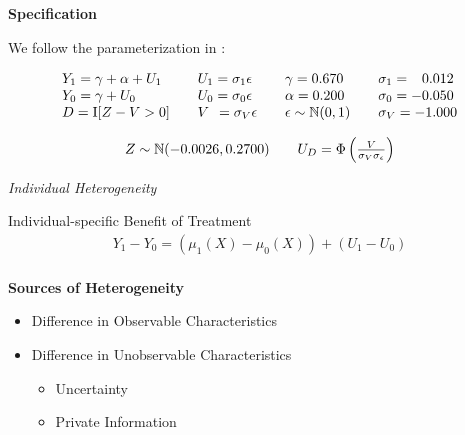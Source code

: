 \begin{frame}\textbf{Specification}\vspace{0.3cm}

We follow the parameterization in \citet{Heckman.2005e}:

\begin{align*}\begin{array}{l@{\qquad}l@{\qquad}l@{\qquad}l}
Y_1 = \gamma + \alpha + U_1 & U_1 = \sigma_1 \epsilon & \gamma = 0.670          & \sigma_1 = \phantom{-}0.012 \\
Y_0 = \gamma + U_0          & U_0 = \sigma_0 \epsilon & \alpha = 0.200          & \sigma_0 = -0.050 \\
D = \mathrm{I}[Z - V > 0]   & V\phantom{_0} = \sigma_V \epsilon   & \epsilon \sim \N(0, 1) & \sigma_V = -1.000 \\
\end{array}\end{align*}

\begin{align*}\begin{array}{l@{\qquad}l}
Z \sim \N(-0.0026, 0.2700)  & U_D = \Phi\left(\frac{V}{\sigma_V\sigma_\epsilon}\right)\\
\end{array}\end{align*}

\end{frame}
\begin{frame}\begin{center}
\LARGE\textit{Individual Heterogeneity}
\end{center}\end{frame}

\begin{frame}

Individual-specific Benefit of Treatment
\begin{align*}
Y_1 - Y_0 = (\mu_1(X) - \mu_0(X)) + (U_1 - U_0)\\
\end{align*}

\textbf{Sources of Heterogeneity}
\begin{itemize}
	\item Difference in Observable Characteristics
	\item Difference in Unobservable Characteristics
	\begin{itemize}
		\item  Uncertainty
		\item Private Information
	\end{itemize}
\end{itemize}
\end{frame}


